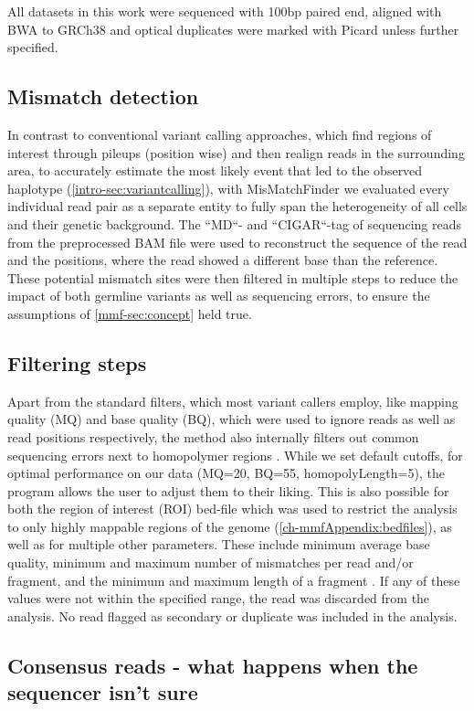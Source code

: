 All datasets in this work were sequenced with 100bp paired end, aligned with BWA to GRCh38 and optical duplicates were marked with Picard unless further specified.

\subsection{Mismatch detection}
In contrast to conventional variant calling approaches, which find regions of interest through pileups (position wise) and then realign reads in the surrounding area, to accurately estimate the most likely event that led to the observed haplotype (\autoref{intro-sec:variantcalling}), with MisMatchFinder we evaluated every individual read pair as a separate entity to fully span the heterogeneity of all cells and their genetic background. The ``MD``- and ``CIGAR``-tag of sequencing reads from the preprocessed BAM file were used to reconstruct the sequence of the read and the positions, where the read showed a different base than the reference. These potential mismatch sites were then filtered in multiple steps to reduce the impact of both germline variants as well as sequencing errors, to ensure the assumptions of \autoref{mmf-sec:concept} held true.

\subsection{Filtering steps}
Apart from the standard filters, which most variant callers employ, like mapping quality (MQ) and base quality (BQ), which were used to ignore reads as well as read positions respectively, the method also internally filters out common sequencing errors next to homopolymer regions \cite{Heydari2019}. While we set default cutoffs, for optimal performance on our data (MQ=20, BQ=55, homopolyLength=5), the program allows the user to adjust them to their liking.
This is also possible for both the region of interest (ROI) bed-file which was used to restrict the analysis to only highly mappable regions of the genome (\autoref{ch-mmfAppendix:bedfiles}), as well as for multiple other parameters. These include minimum average base quality, minimum and maximum number of mismatches per read and/or fragment, and the minimum and maximum length of a fragment \cite{Hudecova2021}. If any of these values were not within the specified range, the read was discarded from the analysis. No read flagged as secondary or duplicate was included in the analysis.

\subsection[Consensus reads]{Consensus reads - what happens when the sequencer isn't sure}
\label{mmf-sec:consensus}

